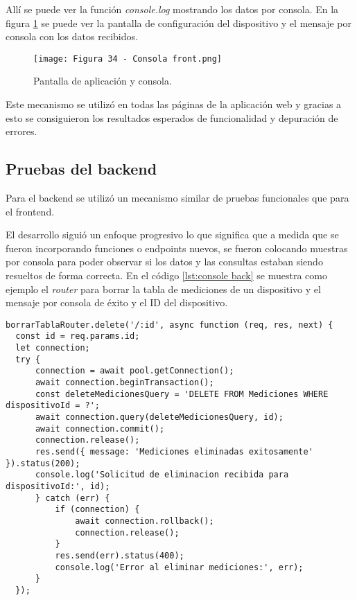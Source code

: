 Allí se puede ver la función \textit{console.log} mostrando los datos por consola. En la figura \ref{fig:34} se puede ver la pantalla de configuración del dispositivo y el mensaje por consola con los datos recibidos.

\newpage
\begin{figure}[h]
\centering
\texttt{[image: Figura 34 - Consola front.png]}
\caption[Pantalla de aplicación y consola del frontend]{Pantalla de aplicación y consola.}
\label{fig:34}
\end{figure}

Este mecanismo se utilizó en todas las páginas de la aplicación web y gracias a esto se consiguieron los resultados esperados de funcionalidad y depuración de errores.

\subsection{Pruebas del backend}

Para el backend se utilizó un mecanismo similar de pruebas funcionales que para el frontend.

El desarrollo siguió un enfoque progresivo lo que significa que a medida que se fueron incorporando funciones o endpoints nuevos, se fueron colocando muestras por consola para poder observar si los datos y las consultas estaban siendo resueltos de forma correcta. En el código \ref{lst:console back} se muestra como ejemplo el \textit{router} para borrar la tabla de mediciones de un dispositivo y el mensaje por consola de éxito y el ID del dispositivo.

\begin{lstlisting}[caption={Muestra por consola de los datos consultados.}, label={lst:console back}]
borrarTablaRouter.delete('/:id', async function (req, res, next) {
  const id = req.params.id;
  let connection;
  try {
      connection = await pool.getConnection();
      await connection.beginTransaction();
      const deleteMedicionesQuery = 'DELETE FROM Mediciones WHERE dispositivoId = ?';
      await connection.query(deleteMedicionesQuery, id);
      await connection.commit();
      connection.release();
      res.send({ message: 'Mediciones eliminadas exitosamente' }).status(200);
      console.log('Solicitud de eliminacion recibida para dispositivoId:', id);
      } catch (err) {
          if (connection) {
              await connection.rollback();
              connection.release();
          }
          res.send(err).status(400);
          console.log('Error al eliminar mediciones:', err);
      }
  });
\end{lstlisting}

